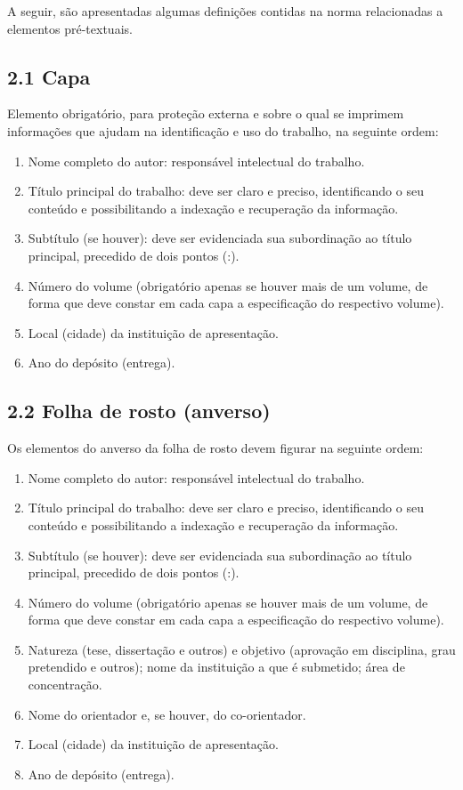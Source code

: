 \documentclass[
	12pt,				%
	oneside,			%
	a4paper,			%
	english,			%
	brazil				%
	]{abntex2ppgsi}
\begin{document}
\begin{anexosenv}
A seguir, são apresentadas algumas definições contidas na norma relacionadas a elementos pré-textuais.

\subsection*{2.1 Capa}

Elemento obrigatório, para proteção externa e sobre o qual se imprimem informações que ajudam na identificação e uso do trabalho, na seguinte ordem:
\begin{enumerate}
	\item Nome completo do autor: responsável intelectual do trabalho.
	\item	Título principal do trabalho: deve ser claro e preciso, identificando o seu conteúdo e possibilitando a indexação e recuperação da informação.
	\item	Subtítulo (se houver): deve ser evidenciada sua subordinação ao título principal, precedido de dois pontos (:).
	\item	Número do volume (obrigatório apenas se houver mais de um volume, de forma que deve constar em cada capa a especificação do respectivo volume).
	\item	Local (cidade) da instituição de apresentação.
	\item	Ano do depósito (entrega).
\end{enumerate}

\subsection*{2.2 Folha de rosto (anverso)}

Os elementos do anverso da folha de rosto devem figurar na seguinte ordem:
\begin{enumerate}
	\item	Nome completo do autor: responsável intelectual do trabalho.
	\item	Título principal do trabalho: deve ser claro e preciso, identificando o seu conteúdo e possibilitando a indexação e recuperação da informação.
	\item	Subtítulo (se houver): deve ser evidenciada sua subordinação ao título principal, precedido de dois pontos (:).
	\item	Número do volume (obrigatório apenas se houver mais de um volume, de forma que deve constar em cada capa a especificação do respectivo volume).
	\item	Natureza (tese, dissertação e outros) e objetivo (aprovação em disciplina, grau pretendido e outros); nome da instituição a que é submetido; área de concentração.
	\item	Nome do orientador e, se houver, do co-orientador.
	\item	Local (cidade) da instituição de apresentação.
	\item	Ano de depósito (entrega).
\end{enumerate}


\end{anexosenv}
\end{document}
